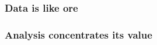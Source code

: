 \documentclass{beamer}
\begin{document}
{
\begin{frame}[plain]
\frametitle{Data is like ore}
\end{frame}
}

{
\begin{frame}[plain]
\frametitle{Analysis concentrates its value}
\end{frame}
}
\end{document}

